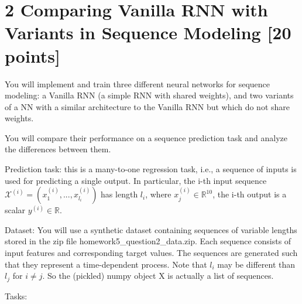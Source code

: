 \documentclass[
  letterpaper,
  DIV=11,
  numbers=noendperiod]{scrartcl}
\begin{document}
\section{2 Comparing Vanilla RNN with Variants in Sequence Modeling
{[}20
points{]}}\label{comparing-vanilla-rnn-with-variants-in-sequence-modeling-20-points}

You will implement and train three different neural networks for
sequence modeling: a Vanilla RNN (a simple RNN with shared weights), and
two variants of a NN with a similar architecture to the Vanilla RNN but
which do not share weights.

You will compare their performance on a sequence prediction task and
analyze the differences between them.

Prediction task: this is a many-to-one regression task, i.e., a sequence
of inputs is used for predicting a single output. In particular, the
i-th input sequence
\(\mathcal{X}^{(i)}=(x_{1}^{(i)},...,x_{l_{i}}^{(i)})\) has length
\(l_{i}\), where \(x_{j}^{(i)}\in\mathbb{R}^{10}\), the i-th output is a
scalar \(y^{(i)}\in\mathbb{R}\).

Dataset: You will use a synthetic dataset containing sequences of
variable lengths stored in the zip file homework5\_question2\_data.zip.
Each sequence consists of input features and corresponding target
values. The sequences are generated such that they represent a
time-dependent process. Note that \(l_{i}\) may be different than
\(l_{j}\) for \(i\ne j\). So the (pickled) numpy object X is actually a
list of sequences.

Tasks:
\end{document}
